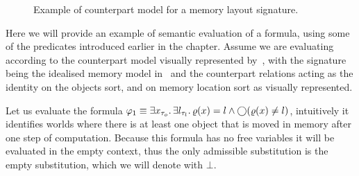 \begin{figure}
  \begin{center}
  \end{center}
  \caption{Example of counterpart model for a memory layout signature.}
  \label{fig:exmemsignature}
\end{figure}

Here we will provide an example of semantic evaluation of a formula, using some of the predicates introduced earlier in the chapter.  Assume we are evaluating according to the counterpart model visually represented by~, with the signature being the idealised memory model in~ and the counterpart relations acting as the identity on the objects sort, and on memory location sort as visually represented. 

Let us evaluate the formula $\varphi_1 \equiv \exists {x_{\tau_o}} \ldotp {\exists {l_{\tau_l}} \ldotp {\varrho(x) = l \land \bigcirc{(\varrho(x) \neq l)}}}$, intuitively it identifies worlds where there is at least one object that is moved in memory after one step of computation.
Because this formula has no free variables it will be evaluated in the empty context, thus the only admissible substitution is the empty substitution, which we will denote with $\bot$.

